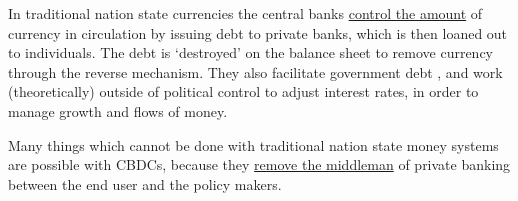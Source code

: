 In traditional nation state currencies the central banks \href{https://www.bankofengland.co.uk/markets/bank-of-england-market-operations-guide}{control the amount} of currency in circulation by issuing debt to private banks, which is then loaned out to individuals. The debt is `destroyed' on the balance sheet to remove currency through the reverse mechanism. They also facilitate government debt \cite{filardo2012central}, and work (theoretically) outside of political control to adjust interest rates, in order to manage growth and flows of money. \par
Many things which cannot be done with traditional nation state money systems are possible with CBDCs, because they \href{https://voxeu.org/article/benefits-central-bank-digital-currency}{remove the middleman} of private banking between the end user and the policy makers. 
